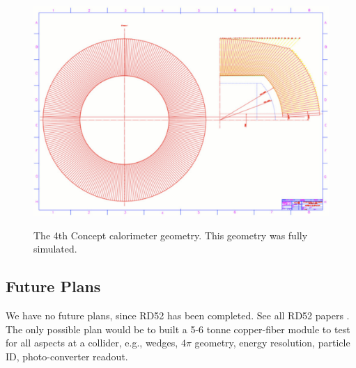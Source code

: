  
\begin{figure}
 \includegraphics[scale=0.35]{Calorimeter/DualReadout/hcalor}
 \label{fig:hcalor}
 \caption{The 4th Concept \cite{4th} calorimeter geometry.   This geometry was fully simulated. }
\end{figure}

\subsection{Future Plans}

We have no future plans, since RD52 has been completed.  See all RD52 papers \cite{dream}. The only possible plan would be to built a 5-6 tonne copper-fiber module to test for all aspects at a collider, e.g., wedges, $4 \pi$ geometry, energy resolution, particle ID, photo-converter readout.  
